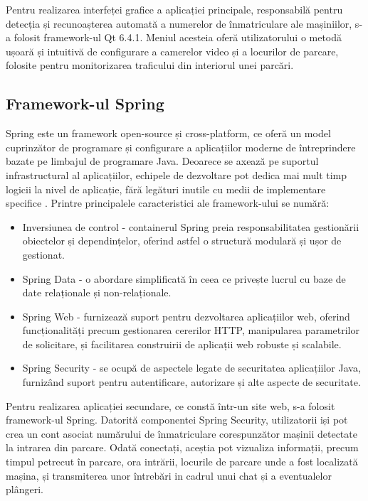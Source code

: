 \documentclass[12pt]{article}
\begin{document}
Pentru realizarea interfeței grafice a aplicației principale, responsabil\u{a} pentru detecția și recunoașterea automat\u{a} a numerelor de \^{i}nmatriculare ale mașiniilor, s-a folosit framework-ul Qt 6.4.1. Meniul acesteia ofer\u{a} utilizatorului o metod\u{a} ușoar\u{a} și intuitiv\u{a} de configurare a camerelor video și a locurilor de parcare, folosite pentru monitorizarea traficului din interiorul unei parc\u{a}ri.


\subsection{Framework-ul Spring}
Spring este un framework open-source și cross-platform, ce ofer\u{a} un model cuprinz\u{a}tor de programare și configurare a aplicațiilor moderne de \^{i}ntreprindere bazate pe limbajul de programare Java. Deoarece se axeaz\u{a} pe suportul infrastructural al aplicațiilor, echipele de dezvoltare pot dedica mai mult timp logicii la nivel de aplicație, f\u{a}r\u{a} leg\u{a}turi inutile cu medii de implementare specifice \cite{spring}. Printre principalele caracteristici ale framework-ului se num\u{a}r\u{a}:
\begin{itemize}
    \item Inversiunea de control - containerul Spring preia responsabilitatea gestion\u{a}rii obiectelor și dependințelor, oferind astfel o structur\u{a} modular\u{a} și ușor de gestionat.
    \item Spring Data - o abordare simplificat\u{a} \^{i}n ceea ce privește lucrul cu baze de date relaționale și non-relaționale.
    \item Spring Web - furnizeaz\u{a} suport pentru dezvoltarea aplicațiilor web, oferind funcționalit\u{a}ți precum gestionarea cererilor HTTP, manipularea parametrilor de solicitare, și facilitarea construirii de aplicații web robuste și scalabile.
    \item Spring Security - se ocup\u{a} de aspectele legate de securitatea aplicațiilor Java, furniz\^{a}nd suport pentru autentificare, autorizare și alte aspecte de securitate.
\end{itemize}

Pentru realizarea aplicației secundare, ce const\u{a} \^{i}ntr-un site web, s-a folosit framework-ul Spring. Datorit\u{a} componentei Spring Security, utilizatorii iși pot crea un cont asociat num\u{a}rului de \^{i}nmatriculare corespunz\u{a}tor mașinii detectate la intrarea din parcare. Odat\u{a} conectați, aceștia pot vizualiza informații, precum timpul petrecut \^{i}n parcare, ora intr\u{a}rii, locurile de parcare unde a fost localizat\u{a} mașina, și transmiterea unor \^{i}ntreb\u{a}ri in cadrul unui chat și a eventualelor pl\^{a}ngeri.
\end{document}
